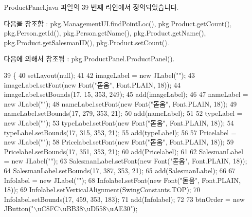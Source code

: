 Product\+Panel.\+java 파일의 39 번째 라인에서 정의되었습니다.



다음을 참조함 \+:  pkg.\+Management\+U\+I.\+find\+Point\+Loc(), pkg.\+Product.\+get\+Count(), pkg.\+Person.\+get\+Id(), pkg.\+Person.\+get\+Name(), pkg.\+Product.\+get\+Name(), pkg.\+Product.\+get\+Salesman\+I\+D(), pkg.\+Product.\+set\+Count().



다음에 의해서 참조됨 \+:  pkg.\+Product\+Panel.\+Product\+Panel().


\begin{DoxyCode}
39                               \{
40         setLayout(null);
41         
42         imageLabel = \textcolor{keyword}{new} JLabel(\textcolor{stringliteral}{""});
43         imageLabel.setFont(\textcolor{keyword}{new} Font(\textcolor{stringliteral}{"돋움"}, Font.PLAIN, 18));
44         imageLabel.setBounds(17, 15, 353, 249);
45         add(imageLabel);
46         
47         nameLabel = \textcolor{keyword}{new} JLabel(\textcolor{stringliteral}{""});
48         nameLabel.setFont(\textcolor{keyword}{new} Font(\textcolor{stringliteral}{"돋움"}, Font.PLAIN, 18));
49         nameLabel.setBounds(17, 279, 353, 21);
50         add(nameLabel);
51         
52         typeLabel = \textcolor{keyword}{new} JLabel(\textcolor{stringliteral}{""});
53         typeLabel.setFont(\textcolor{keyword}{new} Font(\textcolor{stringliteral}{"돋움"}, Font.PLAIN, 18));
54         typeLabel.setBounds(17, 315, 353, 21);
55         add(typeLabel);
56         
57         Pricelabel = \textcolor{keyword}{new} JLabel(\textcolor{stringliteral}{""});
58         Pricelabel.setFont(\textcolor{keyword}{new} Font(\textcolor{stringliteral}{"돋움"}, Font.PLAIN, 18));
59         Pricelabel.setBounds(17, 351, 353, 21);
60         add(Pricelabel);
61         
62         SalesmanLabel = \textcolor{keyword}{new} JLabel(\textcolor{stringliteral}{""});
63         SalesmanLabel.setFont(\textcolor{keyword}{new} Font(\textcolor{stringliteral}{"돋움"}, Font.PLAIN, 18));
64         SalesmanLabel.setBounds(17, 387, 353, 21);
65         add(SalesmanLabel);
66         
67         Infolabel = \textcolor{keyword}{new} JLabel(\textcolor{stringliteral}{""});
68         Infolabel.setFont(\textcolor{keyword}{new} Font(\textcolor{stringliteral}{"돋움"}, Font.PLAIN, 18));
69         Infolabel.setVerticalAlignment(SwingConstants.TOP);
70         Infolabel.setBounds(17, 459, 353, 183);
71         add(Infolabel);
72         
73         btnOrder = \textcolor{keyword}{new} JButton(\textcolor{stringliteral}{"\(\backslash\)uC8FC\(\backslash\)uBB38\(\backslash\)uD558\(\backslash\)uAE30"});

\end{DoxyCode}
